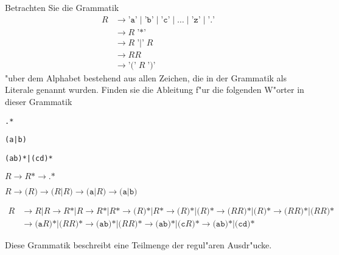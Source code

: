 Betrachten Sie die Grammatik 
\begin{align*}
R&\to \texttt{'a'} \;|\; \texttt{'b'} \;|\; \texttt{'c'} \;|\;\dots\;|\; \texttt{'z'} \;|\; \texttt{'.'}\\
 &\to R\; \texttt{'*'}\\
 &\to R\; \texttt{'|'}\; R\\
 &\to RR\\
 &\to \texttt{'('} \; R \; \texttt{')'}
\end{align*}
"uber dem Alphabet bestehend aus allen Zeichen, die in der Grammatik als
Literale genannt wurden.
Finden sie die Ableitung f"ur die folgenden W"orter in dieser Grammatik
\begin{teilaufgaben}
\item \texttt{.*}
\item \texttt{(a|b)}
\item \texttt{(ab)*|(cd)*}
\end{teilaufgaben}

\begin{loesung}
\begin{teilaufgaben}
\item
\(
R\to R\texttt{*}\to \texttt{.*}
\)
\item \(
R\to \texttt{(} R\texttt{)}
  \to \texttt{(}R\texttt{|}R\texttt{)}
  \to \texttt{(a|}R\texttt{)}
  \to \texttt{(a|b)}
\)
\item
\begin{align*}
R&\to R\texttt{|}R
  \to R\texttt{*|}R
  \to R\texttt{*|}R\texttt{*}
  \to \texttt{(}R\texttt{)*|}R\texttt{*}
  \to \texttt{(}R\texttt{)*|(}R\texttt{)*}
  \to \texttt{(}RR\texttt{)*|(}R\texttt{)*}
  \to \texttt{(}RR\texttt{)*|(}RR\texttt{)*}
\\
 &\to \texttt{(a}R\texttt{)*|(}RR\texttt{)*}
  \to \texttt{(ab)*|(}RR\texttt{)*}
  \to \texttt{(ab)*|(c}R\texttt{)*}
  \to \texttt{(ab)*|(cd)*}
\end{align*}
\end{teilaufgaben}
\end{loesung}

\begin{diskussion}
Diese Grammatik beschreibt eine Teilmenge der regul"aren Ausdr"ucke.
\end{diskussion}

